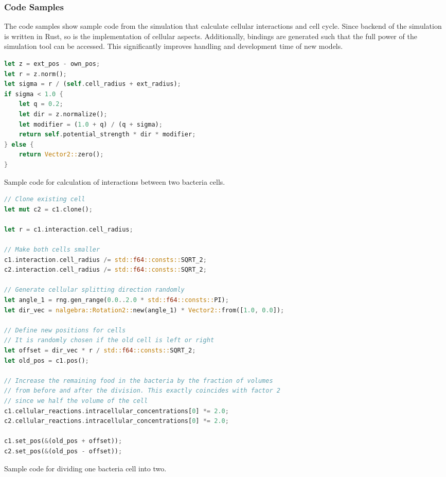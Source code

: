 \documentclass[10pt,twocolumn,5p]{elsarticle}
\numberwithin{equation}{section}
\begin{document}
\subsubsection{Code Samples}
The code samples show sample code from the simulation that calculate cellular interactions and cell cycle.
Since backend of the simulation is written in Rust, so is the implementation of cellular aspects.
Additionally, bindings are generated such that the full power of the simulation tool can be accessed.
This significantly improves handling and development time of new models.
\begin{listing}
\begin{lstlisting}[language=rust]
let z = ext_pos - own_pos;
let r = z.norm();
let sigma = r / (self.cell_radius + ext_radius);
if sigma < 1.0 {
    let q = 0.2;
    let dir = z.normalize();
    let modifier = (1.0 + q) / (q + sigma);
    return self.potential_strength * dir * modifier;
} else {
    return Vector2::zero();
}
\end{lstlisting}
\caption{
    Sample code for calculation of interactions between two bacteria cells.
}
\label{listing:spatial-interaction-strength}
\end{listing}
%
%
\begin{listing}
\begin{lstlisting}[language=rust]
// Clone existing cell
let mut c2 = c1.clone();

let r = c1.interaction.cell_radius;

// Make both cells smaller
c1.interaction.cell_radius /= std::f64::consts::SQRT_2;
c2.interaction.cell_radius /= std::f64::consts::SQRT_2;

// Generate cellular splitting direction randomly
let angle_1 = rng.gen_range(0.0..2.0 * std::f64::consts::PI);
let dir_vec = nalgebra::Rotation2::new(angle_1) * Vector2::from([1.0, 0.0]);

// Define new positions for cells
// It is randomly chosen if the old cell is left or right
let offset = dir_vec * r / std::f64::consts::SQRT_2;
let old_pos = c1.pos();

// Increase the remaining food in the bacteria by the fraction of volumes
// from before and after the division. This exactly coincides with factor 2
// since we half the volume of the cell
c1.cellular_reactions.intracellular_concentrations[0] *= 2.0;
c2.cellular_reactions.intracellular_concentrations[0] *= 2.0;

c1.set_pos(&(old_pos + offset));
c2.set_pos(&(old_pos - offset));
\end{lstlisting}
\caption{
    Sample code for dividing one bacteria cell into two.
}
\end{listing}
%
%
\end{document}
